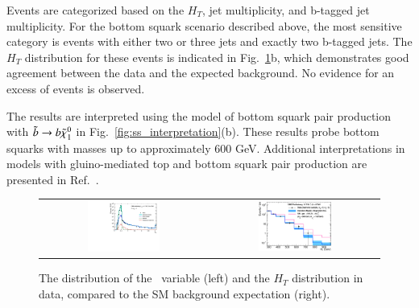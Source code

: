 Events are categorized based on the $H_T$, jet multiplicity, and b-tagged jet multiplicity. For the bottom squark scenario described above, the most sensitive
category is events with either two or three jets and exactly two b-tagged jets. The $H_T$ distribution for these events is indicated in Fig.~\ref{fig:alphat}b,
which demonstrates good agreement between the data and the expected background. No evidence for an excess of events is observed.

The results are interpreted  using the model of bottom squark pair production with $\tilde{b}\to b\tilde{\chi}_{1}^{0}$ in Fig.~\ref{fig:ss_interpretation}(b).
These results probe bottom squarks with masses up to approximately 600 GeV. Additional interpretations in models with gluino-mediated
top and bottom squark pair production are presented in Ref.~\cite{ref:alphat}.

\begin{figure}
\centering
\begin{tabular}{cc}
\includegraphics[width=0.45\textwidth]{HCPPlots/AlphaT_le3j_prelim.pdf} &
\includegraphics[width=0.45\textwidth]{HCPPlots/hadronic_2b_le3j_logy.pdf} \\
\end{tabular}
\caption{
The distribution of the \alphat\ variable (left) and the $H_T$ distribution in data, compared to the SM background expectation (right).
\label{fig:alphat}
}
\end{figure}
